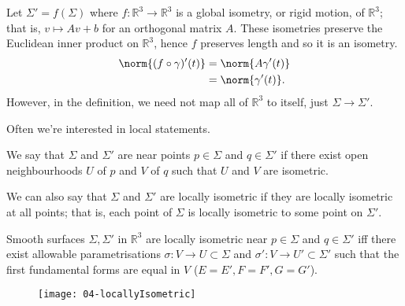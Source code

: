 \begin{example}
	Let $\Sigma' = f(\Sigma)$ where $f \colon \mathbb R^3 \to \mathbb R^3$ is a global isometry, or rigid motion, of $\mathbb R^3$; that is, $v \mapsto Av+b$ for an orthogonal matrix $A$.
	These isometries preserve the Euclidean inner product on $\mathbb R^3$, hence $f$ preserves length and so it is an isometry.
	\begin{align*}
	   \norm{(f \circ \gamma)'(t)} &= \norm{A \gamma'(t)} \\
	   &= \norm{\gamma'(t)}.  
	\end{align*} 
	However, in the definition, we need not map all of $\mathbb R^3$ to itself, just $\Sigma \to \Sigma'$.
\end{example}

Often we're interested in local statements.

\begin{definition}
	We say that $\Sigma$ and $\Sigma'$ are  near points $p \in \Sigma$ and $q \in \Sigma'$ if there exist open neighbourhoods $U$ of $p$ and $V$ of $q$ such that $U$ and $V$ are isometric.
\end{definition}

We can also say that $\Sigma$ and $\Sigma'$ are locally isometric if they are locally isometric at all points; that is, each point of $\Sigma$ is locally isometric to some point on $\Sigma'$.

\begin{lemma}
	Smooth surfaces $\Sigma, \Sigma'$ in $\mathbb R^3$ are locally isometric near $p \in \Sigma$ and $q \in \Sigma'$ iff there exist allowable parametrisations $\sigma \colon V \to U \subset \Sigma$ and $\sigma' \colon V \to U' \subset \Sigma'$ such that the first fundamental forms are equal in $V$ ($E = E', F = F', G = G'$).
\end{lemma}

\begin{figure}[h] 
    \centering 
    \texttt{[image: 04-locallyIsometric]} 
\end{figure}

